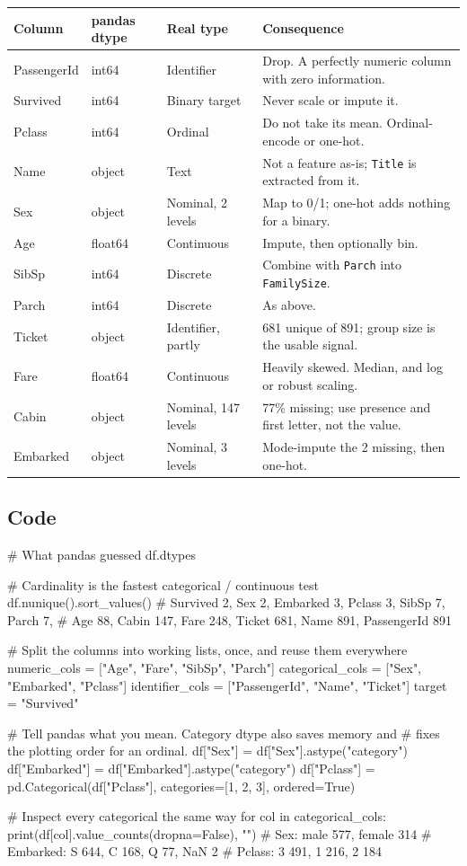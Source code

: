 \documentclass[11pt,a4paper]{article}
\begin{document}
\begin{tabularx}{\textwidth}{@{}>{\ttfamily}l l l X@{}}
\toprule
\rowcolor{tablehead} \textrm{\bfseries Column} & \textbf{pandas dtype} & \textbf{Real type} & \textbf{Consequence} \\
\midrule
PassengerId & int64 & Identifier & Drop. A perfectly numeric column with zero information. \\
Survived & int64 & Binary target & Never scale or impute it. \\
Pclass & int64 & Ordinal & Do not take its mean. Ordinal-encode or one-hot. \\
Name & object & Text & Not a feature as-is; \texttt{Title} is extracted from it. \\
Sex & object & Nominal, 2 levels & Map to 0/1; one-hot adds nothing for a binary. \\
Age & float64 & Continuous & Impute, then optionally bin. \\
SibSp & int64 & Discrete & Combine with \texttt{Parch} into \texttt{FamilySize}. \\
Parch & int64 & Discrete & As above. \\
Ticket & object & Identifier, partly & 681 unique of 891; group size is the usable signal. \\
Fare & float64 & Continuous & Heavily skewed. Median, and log or robust scaling. \\
Cabin & object & Nominal, 147 levels & 77\% missing; use presence and first letter, not the value. \\
Embarked & object & Nominal, 3 levels & Mode-impute the 2 missing, then one-hot. \\
\bottomrule
\end{tabularx}

\subsection{Code}

\begin{py}
# What pandas guessed
df.dtypes

# Cardinality is the fastest categorical / continuous test
df.nunique().sort_values()
# Survived 2, Sex 2, Embarked 3, Pclass 3, SibSp 7, Parch 7,
# Age 88, Cabin 147, Fare 248, Ticket 681, Name 891, PassengerId 891

# Split the columns into working lists, once, and reuse them everywhere
numeric_cols     = ["Age", "Fare", "SibSp", "Parch"]
categorical_cols = ["Sex", "Embarked", "Pclass"]
identifier_cols  = ["PassengerId", "Name", "Ticket"]
target           = "Survived"

# Tell pandas what you mean. Category dtype also saves memory and
# fixes the plotting order for an ordinal.
df["Sex"]      = df["Sex"].astype("category")
df["Embarked"] = df["Embarked"].astype("category")
df["Pclass"]   = pd.Categorical(df["Pclass"], categories=[1, 2, 3], ordered=True)

# Inspect every categorical the same way
for col in categorical_cols:
    print(df[col].value_counts(dropna=False), "\n")
# Sex:      male 577, female 314
# Embarked: S 644, C 168, Q 77, NaN 2
# Pclass:   3 491, 1 216, 2 184
\end{py}
\end{document}
